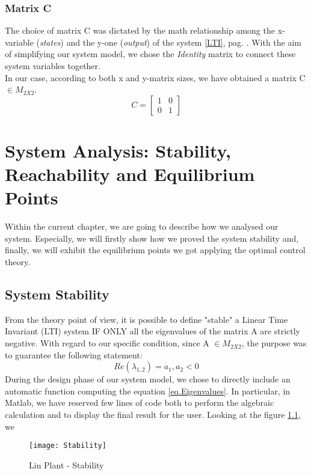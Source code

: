 \documentclass[a4paper,12pt,titlepage]{report}
\numberwithin{figure}{section}
\begin{document}
	\subsection{Matrix C}
	The choice of matrix C was dictated by the math relationship among the x-variable (\textit{states}) and the y-one (\textit{output}) of the system \ref{LTI}, pag. \pageref{LTI}. With the aim of simplifying our system model, we chose the \textit{Identity} matrix to connect these system variables together. \\ In our case, according to both x and y-matrix sizes, we have obtained a matrix C $\in M_{2X2}$.
		\begin{equation}
		C = 
		\begin{bmatrix}
			1 & 0 \\
			0 & 1
		\end{bmatrix}
		\end{equation}
\chapter{System Analysis: Stability, Reachability and Equilibrium Points}
	Within the current chapter, we are going to describe how we analysed our system. Especially, we will firstly show how we proved the system stability and, finally, we will exhibit the equilibrium points we got applying the optimal control theory.
\section{System Stability} 
	From the theory point of view, it is possible to define "stable" a Linear Time Invariant (LTI) system IF ONLY all the eigenvalues of the matrix A are strictly negative. With regard to our specific condition, since A $\in M_{2X2}$, the purpose was to guarantee the following statement:\\
		\begin{equation} \label{eq.Eigenvalues}
			Re(\lambda_{1,2})=a_{1},a_{2} < 0
		\end{equation}
	During the design phase of our system model, we chose to directly include an automatic function computing the equation \ref{eq.Eigenvalues}. In particular, in Matlab, we have reserved few lines of code both to perform the algebraic calculation and to display the final result for the user. Looking at the figure \ref{stability}, we
		\begin{figure}
			\centering
			\texttt{[image: Stability]}
			\caption{Lin Plant - Stability}
			\label{stability}
		\end{figure}
\end{document}
